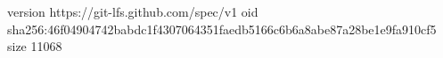 version https://git-lfs.github.com/spec/v1
oid sha256:46f04904742babdc1f4307064351faedb5166c6b6a8abe87a28be1e9fa910cf5
size 11068
